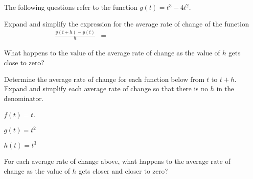 \begin{problem}
  \item The following questions refer to the function $y(t)=t^3-4t^2$.
    \begin{subproblem}
    \item Expand and simplify the expression for the average rate of
      change of the function
      \begin{eqnarray*}
        \frac{y(t+h)-y(t)}{h} & = & ~~~~~~~~~~~~~~~~~~~~~~~~~~~~~~~~~~~~~~~~~~~~~~~~~~~~~~~~~~
      \end{eqnarray*}
      \vspace{3em}
    \item What happens to the value of the average rate of change as
      the value of $h$ gets close to zero?
      \vspace{3em}
    \end{subproblem}
\end{problem}



\begin{problem}
\item Determine the average rate of change for each function below
  from $t$ to $t+h$. Expand and simplify each average rate of change
  so that there is no $h$ in the denominator.
  \begin{subproblem}
    \item $f(t)=t$.
      \vfill
    \item $g(t)=t^2$
      \vfill
    \item $h(t)=t^3$
      \vfill
  \end{subproblem}

\item For each average rate of change above, what happens to the
  average rate of change as the value of $h$ gets closer and closer to
  zero?

\end{problem}


